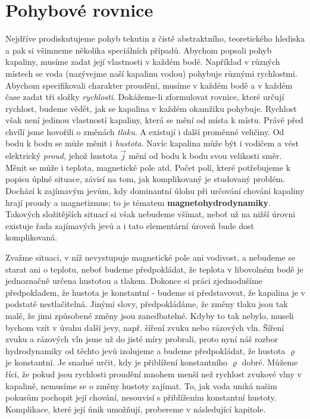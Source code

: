{  \section{Pohybové rovnice}\label{fyz:IIchapXLsecII}
    Nejdříve prodiskutujeme pohyb tekutin z čistě abstraktního, teoretického hlediska a pak si 
    všimneme několika speciálních případů. Abychom popsali pohyb kapaliny, musíme zadat její 
    vlastnosti v každém bodě. Například v různých místech se voda (nazývejme naší kapalinu vodou) 
    pohybuje různými rychlostmi. Abychom specifikovali charakter proudění, musíme v každém bodě a v 
    každém čase zadat tři složky \emph{rychlosti}. Dokážeme-li zformulovat rovnice, které určují 
    rychlost, budeme vědět, jak se kapalina v každém okamžiku pohybuje. Rychlost však není jedinou 
    vlastností kapaliny, která se mění od místa k místu. Právě před chvílí jsme hovořili o změnách 
    \emph{tlaku}. A existují i další proměnné veličiny. Od bodu k bodu se může měnit i 
    \emph{hustota}. Navíc kapalina může být i vodičem a vést elektrický \emph{proud}, jehož hustota 
    \(\vec{j}\) mění od bodu k bodu svou velikosti směr. Měnit se může i teplota, magnetické pole 
    atd. Počet polí, které potřebujeme k popisu úplné situace, závisí na tom, jak komplikovaný je 
    studovaný problém. Dochází k zajímavým jevům, kdy dominantní úlohu při určování chování 
    kapaliny hrají proudy a magnetizmus; to je tématem \textbf{magnetohydrodynamiky}. Takových 
    složitějších situací si však nebudeme všímat, neboť už na nižší úrovni existuje řada zajímavých 
    jevů a i tato elementární úroveň bude dost komplikovaná. 
    
    Zvažme situaci, v níž nevystupuje magnetické pole ani vodivost, a nebudeme se starat ani o 
    teplotu, neboť budeme předpokládat, že teplota v libovolném bodě je jednoznačně určena hustotou 
    a tlakem. Dokonce si práci zjednodušíme předpokladem, že hustota je konstantní - budeme si 
    představovat, že kapalina je v podstatě nestlačitelná. Jinými slovy, předpokládáme, že změny 
    tlaku jsou tak malé, že jimi způsobené změny jsou zanedbatelné. Kdyby to tak nebylo, museli 
    bychom vzít v úvahu další jevy, např. šíření zvuku nebo rázových vln. Šíření zvuku a rázových 
    vln jsme už do jisté míry probrali, proto nyní náš rozbor hydrodynamiky od těchto jevů 
    izolujeme a budeme předpokládat, že hustota \(\varrho\) je konstantní. Je snadné určit, kdy je 
    přiblížení konstantního \(\varrho\) dobré. Můžeme říci, že pokud jsou rychlosti proudění mnohem 
    menší než rychlost zvukové vlny v kapalině, nemusíme se o změny hustoty zajímat. To, jak voda 
    uniká našim pokusům pochopit její chování, nesouvisí s přiblížením konstantní hustoty. 
    Komplikace, které její únik umožňují, probereme v následující kapitole. 
    
}
